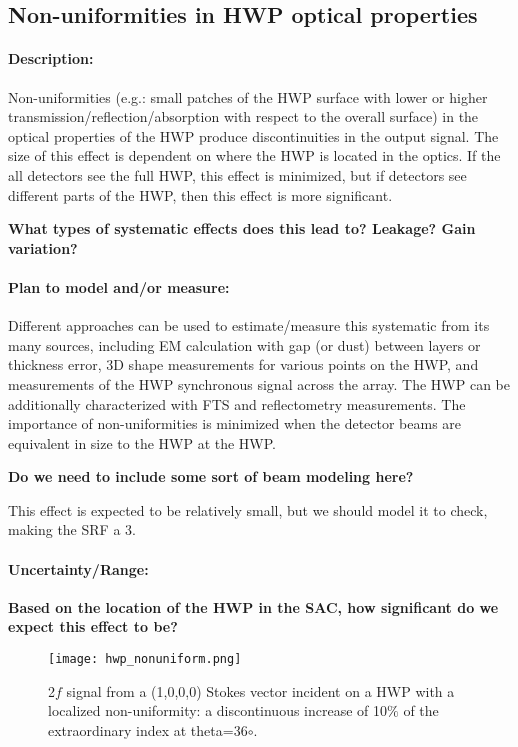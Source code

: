 \subsection{Non-uniformities in HWP optical properties}

\paragraph{Description:}
Non-uniformities (e.g.: small patches of the HWP surface with lower or higher transmission/reflection/absorption with respect to the overall surface) in the optical properties of the HWP produce discontinuities in the output signal. The size of this effect is dependent on where the HWP is located in the optics. If the all detectors see the full HWP, this effect is minimized, but if detectors see different parts of the HWP, then this effect is more significant.

\textbf{What types of systematic effects does this lead to? Leakage? Gain variation?}



\paragraph{Plan to model and/or measure:}
Different approaches can be used to estimate/measure this systematic from its many sources, including EM calculation with gap (or dust) between layers or thickness error, 3D shape measurements for various points on the HWP, and measurements of the
HWP synchronous signal across the array. The HWP can be additionally characterized with FTS and reflectometry measurements. The importance of non-uniformities is minimized when the detector beams are equivalent in size to the HWP at the HWP.

\textbf{Do we need to include some sort of beam modeling here?}

This effect is expected to be relatively small, but we should model it to check, making the SRF a 3.

\paragraph{Uncertainty/Range:}
\textbf{Based on the location of the HWP in the SAC, how significant do we expect this effect to be?}

\begin{figure}
\begin{center}
\texttt{[image: hwp\_nonuniform.png]}
\caption{2$f$ signal from a (1,0,0,0) Stokes vector incident on a HWP with a localized non-uniformity: a discontinuous increase of
10$\%$ of the extraordinary index at theta=36${\circ}$.}\label{hwpnonuniform}
\end{center}
\end{figure}

